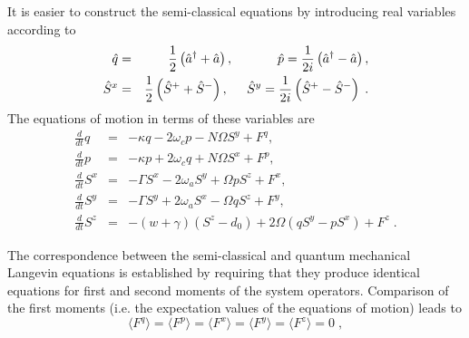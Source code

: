 \documentclass[aps,
twocolumn,
superscriptaddress,groupedaddress]{revtex4}
\begin{document}
It is easier to construct the semi-classical equations by introducing
real variables according to
\begin{eqnarray}
\hspace{-0.5in} \hat{q} &=&
\frac{1}{2} \left( \hat{a}^{\dagger} + \hat{a} \right),
\hspace{0.48in} \hat{p} =
\frac{1}{2i} \left( \hat{a}^{\dagger} - \hat{a} \right),
\\
\hat{S}^x &=&
\frac{1}{2} \left( \hat{S}^{+} + \hat{S}^{-} \right),
\hspace{0.2in} \hat{S}^y =
\frac{1}{2i} \left( \hat{S}^{+} - \hat{S}^{-} \right)\;.
\end{eqnarray}
The equations of motion in terms of these variables are
\begin{eqnarray}
\frac{d}{dt} q &=& -\kappa q - 2 \omega_c p - N \Omega S^{y} + F^{q},
\label{cq1}
\\
\frac{d}{dt} p&=& -\kappa p + 2 \omega_c q + N \Omega S^{x} + F^{p},
\\
\frac{d}{dt} S^{x} &=&
-\Gamma S^{x}  - 2 \omega_a S^{y} + \Omega p S^{z} + F^{x},
\\
\frac{d}{dt} S^{y} &=&
-\Gamma S^{y}  + 2 \omega_a S^{x} - \Omega q S^{z} + F^{y},
\\
\frac{d}{dt} S^{z} &=& -(w+\gamma)\left( S^{z} - d_0\right)
+2 \Omega \left( q S^{y} - p S^{x} \right)
+F^{z}\;.
\label{eqn:cnumberlangevin}
\end{eqnarray}

The correspondence between the semi-classical and quantum mechanical
Langevin equations is established by requiring that they produce
identical equations for first and second moments of the system
operators.  Comparison of the first moments (i.e. the expectation
values of the equations of motion) leads to
\begin{equation}
\langle F^q\rangle = 
\langle F^p\rangle = 
\langle F^x\rangle = 
\langle F^y\rangle = 
\langle F^z\rangle = 0\;,
\end{equation}
\end{document}
